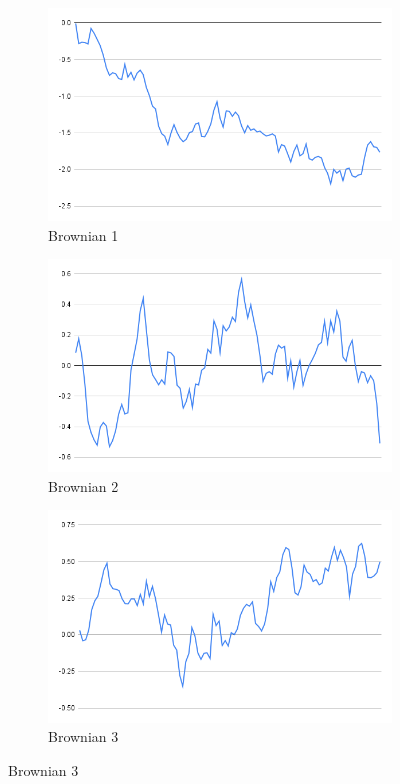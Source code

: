 \documentclass{article}
\begin{document}
\subsection{}
\begin{figure}[ht!]
\begin{subfigure}[h]{0.3\linewidth}
  \includegraphics[width=\linewidth]{img/bm1.png}
  \caption{Brownian 1}
\end{subfigure}
\hfill
\begin{subfigure}[h]{0.3\linewidth}
  \includegraphics[width=\linewidth]{img/bm2.png}
  \caption{Brownian 2}
\end{subfigure}
\hfill
\begin{subfigure}[h]{0.3\linewidth}
  \includegraphics[width=\linewidth]{img/bm3.png}
  \caption{Brownian 3}
\end{subfigure}
\hfill
\end{figure}
\end{document}
